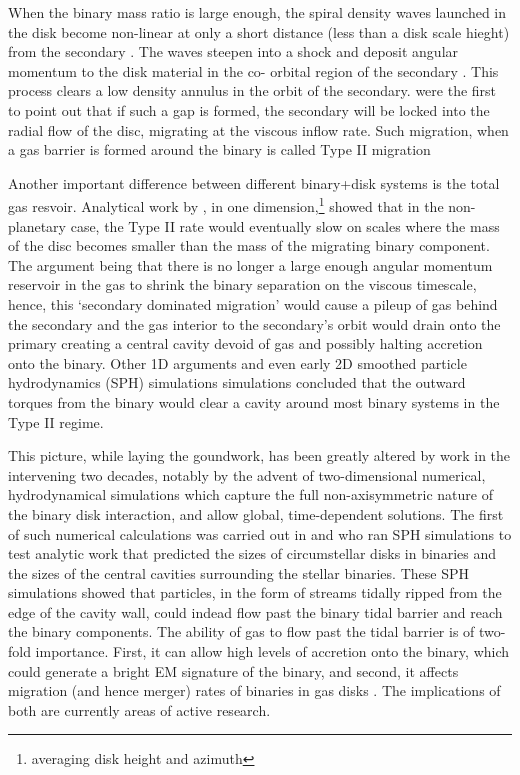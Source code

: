 When the binary mass ratio is large enough, the spiral density waves launched
in the disk become non-linear at only a short distance (less than a disk scale
hieght) from the secondary \citep{GoodmanRafikov:2001}. The waves steepen into
a shock and deposit angular momentum to the disk material in the co- orbital
region of the secondary \citep{RafikovDong:2012, LinPapa, chapter3}. This
process clears a low density annulus in the orbit of the secondary.
\cite{LinPapa:1986b} were the first to point out that if such a gap is formed,
the secondary will be locked into the radial flow of the disc, migrating at
the viscous inflow rate. Such migration, when a gas barrier is formed around
the binary is called Type II migration \citep[see also][and Chapter 3]{Ward:1997, KleyNelson:2013, othertypeIIrefs}



Another important difference between different binary+disk systems is the
total gas resvoir. Analytical work by \citep{SyerClarke:95, Ivanov:1999}, in
one dimension,\footnote{averaging disk height and azimuth} showed that in the
non- planetary case, the Type II rate would eventually slow on scales where
the mass of the disc becomes smaller than the mass of the migrating binary
component. The argument being that there is no longer a large enough angular
momentum reservoir in the gas to shrink the binary separation on the viscous
timescale, hence, this `secondary dominated migration' would cause a pileup of
gas behind the secondary and the gas interior to the secondary's orbit would
drain onto the primary creating a central cavity devoid of gas and possibly
halting accretion onto the binary. Other 1D arguments \citep{other1Darguments} and even early 2D smoothed particle hydrodynamics (SPH)
simulations simulations \citep{Artymowicz:1991} concluded that the outward
torques from the binary would clear a cavity around most binary systems in the
Type II regime.


This picture, while laying the goundwork, has been greatly altered by work in
the intervening two decades, notably by the advent of two-dimensional
numerical, hydrodynamical simulations which capture the full non-axisymmetric
nature of the binary disk interaction, and allow global, time-dependent
solutions. The first of such numerical calculations was carried out in
\cite{ArtyLubow:1994} and \cite{ArtyLubow:1996} who ran SPH simulations to
test analytic work that predicted the sizes of circumstellar disks in binaries
and the sizes of the central cavities surrounding the stellar binaries. These
SPH simulations showed that particles, in the form of streams tidally ripped
from the edge of the cavity wall, could indead flow past the binary tidal
barrier and reach the binary components. The ability of gas to flow past the
tidal barrier is of two-fold importance. First, it can allow high levels of
accretion onto the binary, which could generate a bright EM signature of the
binary, and second, it affects migration (and hence merger) rates of binaries
in gas disks \citep{Duffell:FTV}. The implications of both are currently areas
of active research. 




